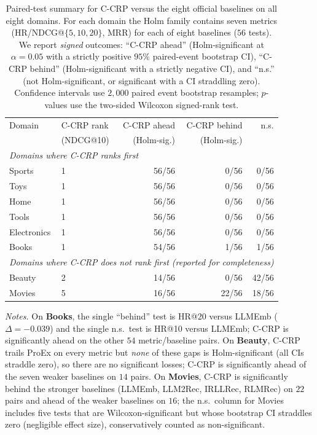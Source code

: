 \begin{table}[t]
\centering
\scriptsize
\caption{Paired-test summary for C-CRP versus the eight official baselines on all
eight domains. For each domain the Holm family contains seven metrics
(HR/NDCG@$\{5,10,20\}$, MRR) for each of eight baselines ($56$ tests). We report
\emph{signed} outcomes: ``C-CRP ahead'' (Holm-significant at $\alpha{=}0.05$ with a
strictly positive $95\%$ paired-event bootstrap CI), ``C-CRP behind''
(Holm-significant with a strictly negative CI), and ``n.s.'' (not Holm-significant,
or significant with a CI straddling zero). Confidence intervals use $2{,}000$ paired
event bootstrap resamples; $p$-values use the two-sided Wilcoxon signed-rank test.}
\label{tab:significance_summary}
\begin{tabular}{llrrr}
\toprule
Domain & C-CRP rank & C-CRP ahead & C-CRP behind & n.s. \\
 & (NDCG@10) & (Holm-sig.) & (Holm-sig.) & \\
\midrule
\multicolumn{5}{l}{\emph{Domains where C-CRP ranks first}}\\
Sports      & 1 & 56/56 & 0/56 & 0/56 \\
Toys        & 1 & 56/56 & 0/56 & 0/56 \\
Home        & 1 & 56/56 & 0/56 & 0/56 \\
Tools       & 1 & 56/56 & 0/56 & 0/56 \\
Electronics & 1 & 56/56 & 0/56 & 0/56 \\
Books       & 1 & 54/56 & 1/56 & 1/56 \\
\midrule
\multicolumn{5}{l}{\emph{Domains where C-CRP does not rank first (reported for completeness)}}\\
Beauty      & 2 & 14/56 & 0/56 & 42/56 \\
Movies      & 5 & 16/56 & 22/56 & 18/56 \\
\bottomrule
\end{tabular}

\vspace{2pt}
{\scriptsize \emph{Notes.} On \textbf{Books}, the single ``behind'' test is HR@20
versus LLMEmb ($\Delta{=}-0.039$) and the single n.s.\ test is HR@10 versus LLMEmb;
C-CRP is significantly ahead on the other $54$ metric/baseline pairs. On
\textbf{Beauty}, C-CRP trails ProEx on every metric but \emph{none} of these gaps is
Holm-significant (all CIs straddle zero), so there are no significant losses; C-CRP
is significantly ahead of the seven weaker baselines on $14$ pairs. On
\textbf{Movies}, C-CRP is significantly behind the stronger baselines (LLMEmb,
LLM2Rec, IRLLRec, RLMRec) on $22$ pairs and ahead of the weaker baselines on $16$;
the n.s.\ column for Movies includes five tests that are Wilcoxon-significant but
whose bootstrap CI straddles zero (negligible effect size), conservatively counted
as non-significant.}
\end{table}
